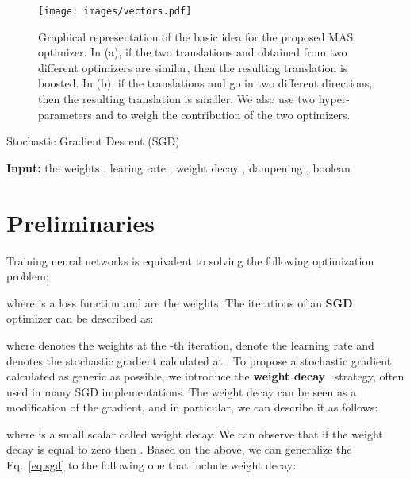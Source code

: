 \documentclass[10pt,twocolumn,letterpaper]{article}
\begin{document}
\begin{figure}
    \centering
    \texttt{[image: images/vectors.pdf]}
    \caption{Graphical representation of the basic idea for the proposed MAS optimizer. In (a), if the two translations  and  obtained from two different optimizers are similar, then the resulting translation  is boosted. In (b), if the translations  and  go in two different directions, then the resulting translation is smaller. We also use two hyper-parameters  and  to weigh the contribution of the two optimizers.}
    \label{fig:intuitive}
\end{figure}

\begin{algorithm} \scriptsize
\caption{Stochastic Gradient Descent (SGD)}
\textbf{Input:} the weights , learing rate , weight decay , dampening , boolean 
\begin{algorithmic}[1]
\State{}
\Function{}{, , , , , }
    \State{}
    \If{}
        \If{}
            \State{}
        \Else
            \State{}
        \EndIf
        \If{}
            \State{}
        \EndIf
    \EndIf
    \State{\Return{}}
\EndFunction

    \State{}
\EndFor

\end{algorithmic}
\label{alg:sgd}
\end{algorithm}


\section{Preliminaries}
Training neural networks is equivalent to solving the following optimization problem:

where  is a loss function and  are the weights. 
The iterations of an \textbf{SGD}~\cite{robbins1951stochastic} optimizer can be described as:

where  denotes the weights  at the -th iteration,  denote the learning rate and  denotes the stochastic gradient calculated at .
To propose a stochastic gradient calculated as generic as possible, we introduce the \textbf{weight decay}~\cite{krogh1992simple} strategy, often used in many SGD implementations. 
The weight decay can be seen as a modification of the  gradient, and in particular, we can describe it as follows:

where  is a small scalar called weight decay.
We can observe that if the weight decay  is equal to zero then .
Based on the above, we can generalize the Eq.~\ref{eq:sgd}  to the following one that include weight decay:
\end{document}
